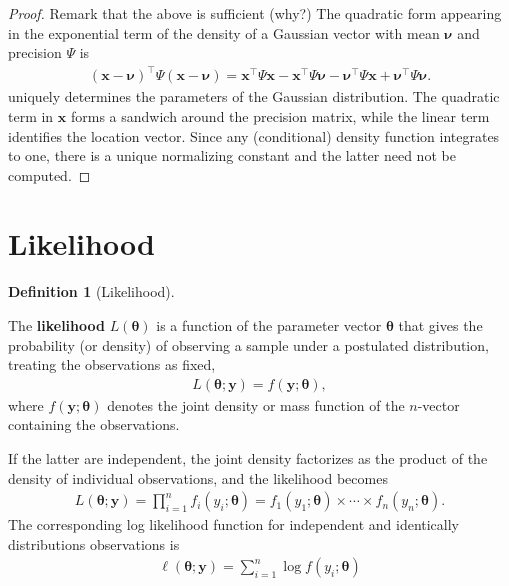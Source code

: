 \documentclass[
  11pt,
  letterpaper,
]{scrbook}
\theoremstyle{definition}
\theoremstyle{plain}
\theoremstyle{plain}
\theoremstyle{plain}
\theoremstyle{definition}
\theoremstyle{definition}
\newtheorem{definition}{Definition}[chapter]
\theoremstyle{plain}
\theoremstyle{plain}
\theoremstyle{remark}
\begin{document}
\begin{proof}
Remark that the above is sufficient (why?) The quadratic form appearing
in the exponential term of the density of a Gaussian vector with mean
\(\boldsymbol{\nu}\) and precision \(\boldsymbol{\varPsi}\) is
\begin{align*}
 (\boldsymbol{x}-\boldsymbol{\nu})^\top\boldsymbol{\varPsi}(\boldsymbol{x}-\boldsymbol{\nu})= \boldsymbol{x}^\top\boldsymbol{\varPsi}\boldsymbol{x} - \boldsymbol{x}^\top\boldsymbol{\varPsi}\boldsymbol{\nu} - 
\boldsymbol{\nu}^\top\boldsymbol{\varPsi}\boldsymbol{x} + \boldsymbol{\nu}^\top\boldsymbol{\varPsi}\boldsymbol{\nu}.
\end{align*} uniquely determines the parameters of the Gaussian
distribution. The quadratic term in \(\boldsymbol{x}\) forms a sandwich
around the precision matrix, while the linear term identifies the
location vector. Since any (conditional) density function integrates to
one, there is a unique normalizing constant and the latter need not be
computed.

\end{proof}

\section{Likelihood}\label{likelihood}

\begin{definition}[Likelihood]\protect\hypertarget{def-likelihood}{}\label{def-likelihood}

The \textbf{likelihood} \(L(\boldsymbol{\theta})\) is a function of the
parameter vector \(\boldsymbol{\theta}\) that gives the probability (or
density) of observing a sample under a postulated distribution, treating
the observations as fixed, \begin{align*}
L(\boldsymbol{\theta}; \boldsymbol{y}) = f(\boldsymbol{y}; \boldsymbol{\theta}),
\end{align*} where \(f(\boldsymbol{y}; \boldsymbol{\theta})\) denotes
the joint density or mass function of the \(n\)-vector containing the
observations.

If the latter are independent, the joint density factorizes as the
product of the density of individual observations, and the likelihood
becomes \begin{align*}
L(\boldsymbol{\theta}; \boldsymbol{y})=\prod_{i=1}^n f_i(y_i; \boldsymbol{\theta}) = f_1(y_1; \boldsymbol{\theta}) \times \cdots \times f_n(y_n; \boldsymbol{\theta}).
\end{align*} The corresponding log likelihood function for independent
and identically distributions observations is \begin{align*}
\ell(\boldsymbol{\theta}; \boldsymbol{y}) = \sum_{i=1}^n \log f(y_i; \boldsymbol{\theta})
\end{align*}

\end{definition}
\end{document}
